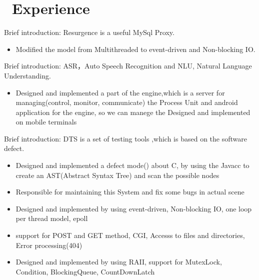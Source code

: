 \documentclass{resume}
\begin{document}
\section{\faBriefcase\ Experience}
Brief introduction: Resurgence is a useful MySql Proxy.
\begin{itemize}
  \item Modified the model from Multithreaded to event-driven and Non-blocking IO.
\end{itemize}
Brief introduction: ASR，Auto Speech Recognition and NLU, Natural Language Understanding.
\begin{itemize}
  \item Designed and implemented a part of the engine,which is a server for managing(control, monitor, communicate) the Process Unit and android application for the engine, so we can manege the Designed and implemented on mobile terminals
\end{itemize}
Brief introduction: DTS is a set of testing tools ,which is based on the software defect.
\begin{itemize}
  \item Designed and implemented a defect mode() about C, by using the Javacc to create an AST(Abstract Syntax Tree) and scan the possible nodes
  \item Responsible for maintaining this System and fix some bugs in actual scene
\end{itemize}
\begin{itemize}
  \item Designed and implemented by using event-driven, Non-blocking IO, one loop per thread model, epoll
  \item support for POST and GET method, CGI, Accesss to files and directories, Error processing(404)
\end{itemize}
\begin{itemize}
  \item Designed and implemented by using RAII, support for MutexLock, Condition, BlockingQueue, CountDownLatch
\end{itemize}
\end{document}
